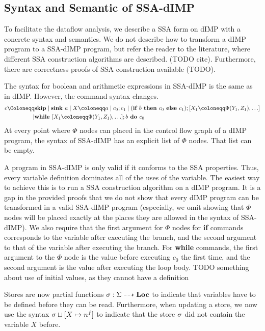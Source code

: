 \subsection{Syntax and Semantic of SSA-dIMP}
To facilitate the dataflow analysis, we describe a SSA form on dIMP with a concrete
syntax and semantics.
We do not describe how to transform a dIMP program to a SSA-dIMP program, but 
refer the reader to the literature, where different SSA construction algorithms are
described. (TODO cite). Furthermore, there are correctness proofs of SSA construction
available (TODO).

The syntax for boolean and arithmetic expressions in SSA-dIMP is the same as in dIMP.
However, the command syntax changes.
\begin{align*}
    c \Coloneqq &\skipcmd \mid \defaultsink \mid \defaultstore \mid \defaultseq 
    \mid \defaultssaif\\
    \mid &\defaultssawhile \\
\end{align*}
At every point where $\Phi$ nodes can placed in the control flow graph
of a dIMP program, the syntax of SSA-dIMP has an explicit list of $\Phi$ nodes.
That list can be empty.

A program in SSA-dIMP is only valid if it conforms to the SSA properties.
Thus, every variable definition dominates all of the uses of the variable.
The easiest way to achieve this is to run a SSA construction algorithm on a dIMP program.
It is a gap in the provided proofs that we do not show that every dIMP program
can be transformed in a valid SSA-dIMP program (especially, we omit showing that
$\Phi$ nodes will be placed exactly at the places they are allowed in the syntax
of SSA-dIMP).
We also require that the first argument for $\Phi$ nodes for \textbf{if} commands
corresponds to the variable after executing the \btrue branch, and the second argument to that
of the variable after executing the \bfalse branch.
For \textbf{while} commands, the first argument to the $\Phi$ node is the value
before executing $c_0$ the first time, and the second argument is the value 
after executing the loop body.
TODO something about use of initial values, as they cannot have a definition

Stores are now partial functions $\sigma : \Sigma \dashrightarrow \textbf{Loc}$ to indicate that
variables have to be defined before they can be read.
Furthermore, when updating a store, we now use the syntax 
$\sigma \sqcup [X \mapsto n^f{}]$ to indicate that the store $\sigma$ did not
contain the variable $X$ before.

